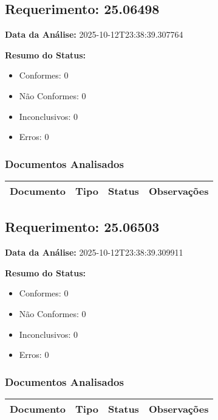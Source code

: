 \documentclass[12pt,a4paper]{article}
\begin{document}
\subsection{Requerimento: 25.06498}

\textbf{Data da Análise:} 2025-10-12T23:38:39.307764

\textbf{Resumo do Status:}
\begin{itemize}
    \item Conformes: 0
    \item Não Conformes: 0
    \item Inconclusivos: 0
    \item Erros: 0
\end{itemize}

\subsubsection{Documentos Analisados}

\begin{longtable}{|p{4cm}|p{2cm}|p{2cm}|p{6cm}|}
\hline
\textbf{Documento} & \textbf{Tipo} & \textbf{Status} & \textbf{Observações} \\
\hline
\endhead
\end{longtable}


\subsection{Requerimento: 25.06503}

\textbf{Data da Análise:} 2025-10-12T23:38:39.309911

\textbf{Resumo do Status:}
\begin{itemize}
    \item Conformes: 0
    \item Não Conformes: 0
    \item Inconclusivos: 0
    \item Erros: 0
\end{itemize}

\subsubsection{Documentos Analisados}

\begin{longtable}{|p{4cm}|p{2cm}|p{2cm}|p{6cm}|}
\hline
\textbf{Documento} & \textbf{Tipo} & \textbf{Status} & \textbf{Observações} \\
\hline
\endhead
\end{longtable}
\end{document}
